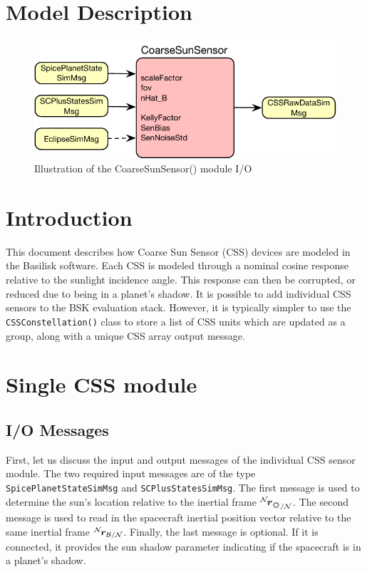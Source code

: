 \section{Model Description}

\begin{figure}[htb]
	\centerline{
		\includegraphics[]{Figures/moduleDiagram}
	}
	\caption{Illustration of the CoarseSunSensor() module I/O}
	\label{fig:moduleDiagram}
\end{figure}
\section{Introduction}
This document describes how Coarse Sun Sensor (CSS) devices are modeled in the Basilisk software.  Each CSS is modeled through a nominal cosine response relative to the sunlight incidence angle.  This response can then be corrupted, or reduced due to being in a planet's shadow.  It is possible to add individual CSS sensors to the BSK evaluation stack.  However, it is typically simpler to use the {\tt CSSConstellation()} class to store a list of CSS units which are updated as a group, along with a unique CSS array output message.

\section{Single CSS module}
\subsection{I/O Messages}
First, let us discuss the input and output messages of the individual CSS sensor module.  The two required input messages are of the type {\tt SpicePlanetStateSimMsg} and {\tt SCPlusStatesSimMsg}.  The first message is used to determine the sun's location relative to the inertial frame $\leftexp{N}{\bm r}_{\sun/\mathcal{N}}$.  The second message is used to read in the spacecraft inertial position vector relative to the same inertial frame $\leftexp{N}{\bm r}_{\cal B/N}$.  Finally, the last message is optional.  If it is connected, it provides the sun shadow parameter indicating if the spacecraft is in a planet's shadow.  

